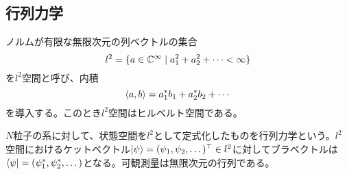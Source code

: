 \subsection{行列力学}
    \begin{dfn}[$l^2$空間]
        ノルムが有限な無限次元の列ベクトルの集合
            \[l^2 = \{a \in \mathbb{C}^\infty \mid a_1^2 + a_2^2 + \dots < \infty\}\]
        を$l^2$空間と呼び、内積
            \[\langle a, b \rangle = a_1^*b_1 + a_2^*b_2 + \cdots\]
        を導入する。このとき$l^2$空間はヒルベルト空間である。
    \end{dfn}
    $N$粒子の系に対して、状態空間を$l^2$として定式化したものを行列力学という。$l^2$空間におけるケットベクトル$\ket{\psi} = (\psi_1, \psi_2, \dots)^\top \in l^2$に対してブラベクトルは$\bra{\psi} = (\psi_1^*, \psi_2^*, \dots)$となる。可観測量は無限次元の行列である。


